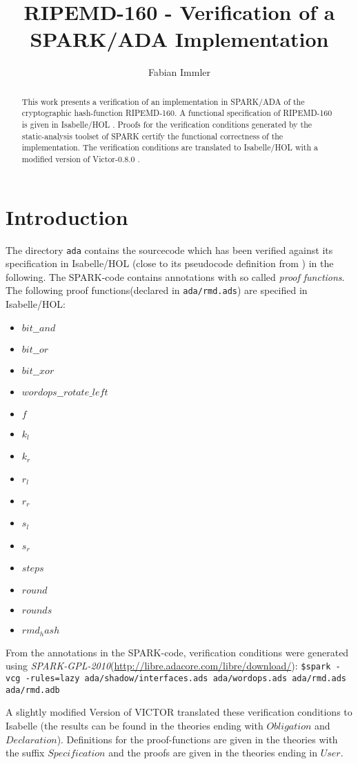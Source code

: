 \documentclass[11pt,a4paper]{article}
\begin{document}
\title{RIPEMD-160 - Verification of a SPARK/ADA Implementation}
\author{Fabian Immler}
\maketitle

\begin{abstract}
This work presents a verification of an implementation in SPARK/ADA \cite{highintegritysoftware} of the cryptographic hash-function RIPEMD-160. A functional specification of RIPEMD-160 \cite{ripemd} is given in Isabelle/HOL \cite{LNCS2283}. Proofs for the verification conditions generated by the static-analysis toolset of SPARK certify the functional correctness of the implementation. The verification conditions are translated to Isabelle/HOL with a modified version of Victor-0.8.0 \cite{vct}.
\end{abstract}

\tableofcontents

\section{Introduction}

The directory \texttt{ada} contains the sourcecode which has been verified
against its specification in Isabelle/HOL (close to its pseudocode definition
from \cite{ripemd}) in the following.  The SPARK-code contains annotations with
so called \emph{proof functions}. The following proof functions(declared in
\texttt{ada/rmd.ads}) are specified in Isabelle/HOL:
\begin{itemize}
\item $bit\_\_and$
\item $bit\_\_or$
\item $bit\_\_xor$
\item $wordops\_\_rotate\_left$
\item $f$
\item $k_l$
\item $k_r$
\item $r_l$
\item $r_r$
\item $s_l$
\item $s_r$
\item $steps$
\item $round$
\item $rounds$
\item $rmd_hash$
\end{itemize}

From the annotations in the SPARK-code, verification conditions were generated
using \emph{SPARK-GPL-2010}(\url{http://libre.adacore.com/libre/download/}):
\texttt{\$spark -vcg -rules=lazy ada/shadow/interfaces.ads ada/wordops.ads
  ada/rmd.ads ada/rmd.adb}

A slightly modified Version of VICTOR \cite{vct} translated these verification
conditions to Isabelle (the results can be found in the theories ending with
$Obligation$ and $Declaration$). Definitions for the proof-functions are given
in the theories with the suffix $Specification$ and the proofs are given in the
theories ending in $User$.






\end{document}
